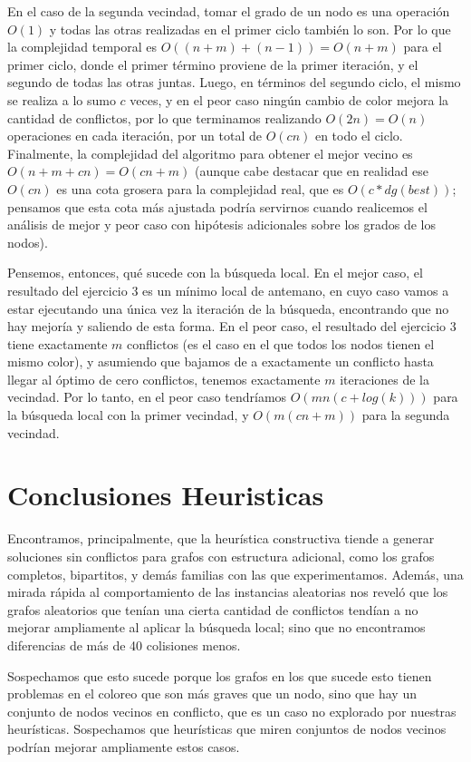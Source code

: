 \documentclass{article}
\theoremstyle{definition}
\theoremstyle{remark}
\begin{document}
En el caso de la segunda vecindad, tomar el grado de un nodo es una operación $O(1)$ y todas las otras realizadas en el primer ciclo también lo son. Por lo que la complejidad temporal es $O((n + m) + (n - 1)) = O(n + m)$ para el primer ciclo, donde el primer término proviene de la primer iteración, y el segundo de todas las otras juntas. Luego, en términos del segundo ciclo, el mismo se realiza a lo sumo $c$ veces, y en el peor caso ningún cambio de color mejora la cantidad de conflictos, por lo que terminamos realizando $O(2n) = O(n)$ operaciones en cada iteración, por un total de $O(cn)$ en todo el ciclo. Finalmente, la complejidad del algoritmo para obtener el mejor vecino es $O(n + m + cn) = O(cn + m)$ (aunque cabe destacar que en realidad ese $O(cn)$ es una cota grosera para la complejidad real, que es $O(c * dg(best))$; pensamos que esta cota más ajustada podría servirnos cuando realicemos el análisis de mejor y peor caso con hipótesis adicionales sobre los grados de los nodos).

Pensemos, entonces, qué sucede con la búsqueda local. En el mejor caso, el resultado del ejercicio 3 es un mínimo local de antemano, en cuyo caso vamos a estar ejecutando una única vez la iteración de la búsqueda, encontrando que no hay mejoría y saliendo de esta forma. En el peor caso, el resultado del ejercicio 3 tiene exactamente $m$ conflictos (es el caso en el que todos los nodos tienen el mismo color), y asumiendo que bajamos de a exactamente un conflicto hasta llegar al óptimo de cero conflictos, tenemos exactamente $m$ iteraciones de la vecindad. Por lo tanto, en el peor caso tendríamos $O(mn(c + log(k)))$ para la búsqueda local con la primer vecindad, y $O(m(cn + m))$ para la segunda vecindad.

\section{Conclusiones Heuristicas}

Encontramos, principalmente, que la heurística constructiva tiende a generar soluciones sin conflictos para grafos con estructura adicional, como los grafos completos, bipartitos, y demás familias con las que experimentamos. Además, una mirada rápida al comportamiento de las instancias aleatorias nos reveló que los grafos aleatorios que tenían una cierta cantidad de conflictos tendían a no mejorar ampliamente al aplicar la búsqueda local; sino que no encontramos diferencias de más de 40 colisiones menos.

Sospechamos que esto sucede porque los grafos en los que sucede esto tienen problemas en el coloreo que son más graves que un nodo, sino que hay un conjunto de nodos vecinos en conflicto, que es un caso no explorado por nuestras heurísticas. Sospechamos que heurísticas que miren conjuntos de nodos vecinos podrían mejorar ampliamente estos casos.
\end{document}
